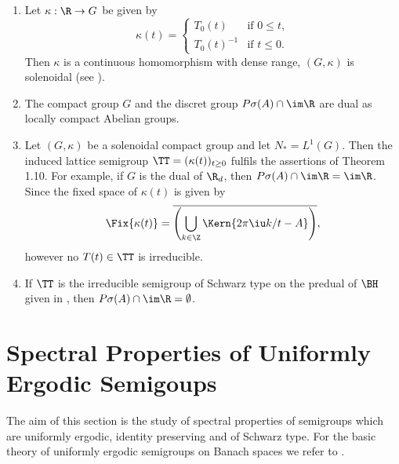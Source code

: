 \begin{remark}\label{rem:d3-1.14}
\begin{enumerate}[\upshape (i), wide, labelindent=.25em]
\item Let $\kappa:\R \to G$ be given by
\[
\kappa(t) = \begin{cases}
T_{0}(t) & \text{if } 0 \leq t , \\
T_{0}(t)^{-1} & \text{if } t \leq 0.
\end{cases}
\]
Then $\kappa$ is a continuous homomorphism with dense range, \ie $(G,\kappa)$ is solenoidal (see \textcite{hewittross:1963}).

\item 
The compact group $G$ and the discret group $P\sigma(A) \cap \im\R$ are dual as locally compact Abelian groups.

\item 
Let $(G,\kappa)$ be a solenoidal compact group and let $N_{*} = L^{1}(G)$.
Then the induced lattice semigroup $\TT = (\kappa(t))_{t \geq 0}$ fulfils the assertions of Theorem 1.10.
For example, if\/ $G$ is the dual of\/ $\R_{d}$, then $P\sigma(A) \cap \im\R = \im\R$.
Since the fixed space of\/ $\kappa(t)$ is given by
\[
	\Fix{\kappa(t)} = 
    \overline{ \left(\bigcup_{k \in \Z} \Kern{2\pi \iu k /t - A} \right) } ,
\]
however no $T(t) \in \TT$ is irreducible.

\item 
If\/ $\TT$ is the irreducible semigroup of Schwarz type on the predual of\/ $\BH$ given in \textcite{evans:1977}, then $P\sigma(A) \cap \im\R = \emptyset$.
\end{enumerate}
\end{remark}

\section{Spectral Properties of Uniformly Ergodic Semigoups}\label{sec:d3-2}
The aim of this section is the study of spectral properties of semigroups which are uniformly ergodic, identity preserving and of Schwarz type.
For the basic theory of uniformly ergodic semigroups on Banach spaces we refer to \textcite{dunfordschwartz:1958}.

